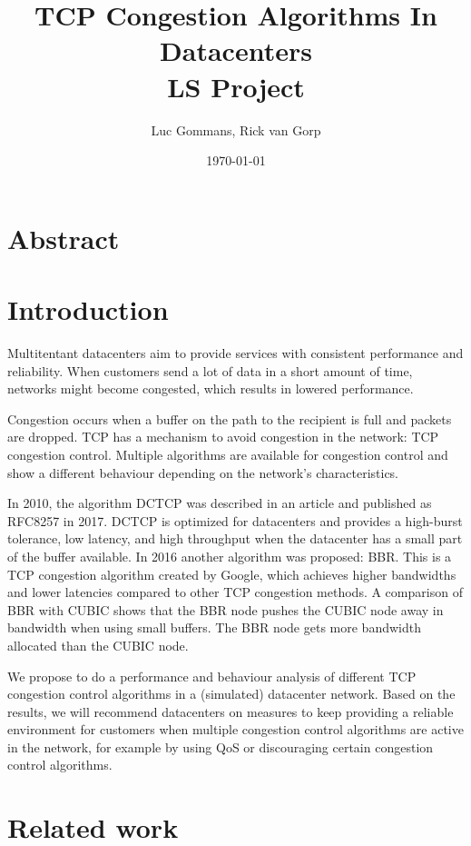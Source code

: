 \documentclass{article}
\title{TCP Congestion Algorithms In Datacenters \\
	\vspace{0.3cm}
	{\large LS Project}
}
\date{\today{}}
\author{Luc Gommans, Rick van Gorp}
\begin{document}
\maketitle

\section{Abstract}


\section{Introduction}


Multitentant datacenters aim to provide services with consistent performance
and reliability. When customers send a lot of data in a short amount of time,
networks might become congested, which results in lowered performance.

Congestion occurs when a buffer on the path to the recipient is full and
packets are dropped. TCP has a mechanism to avoid congestion in the network:
TCP congestion control. Multiple algorithms are available for congestion
control and show a different behaviour depending on the network's
characteristics.

In 2010, the algorithm DCTCP was described in an
article\cite{dctcp-congestion-original} and published as RFC8257 in
2017\cite{dctcp-congestion}. DCTCP is optimized for datacenters and provides a
high-burst tolerance, low latency, and high throughput when the datacenter has
a small part of the buffer available\cite{dctcp-congestion}. In 2016 another
algorithm was proposed: BBR. This is a TCP congestion algorithm created by
Google, which achieves higher bandwidths and lower latencies compared to other
TCP congestion methods\cite{bbr-congestion}. A comparison of BBR with
CUBIC\cite{bbr-congestion-comparison} shows that the BBR node pushes the CUBIC
node away in bandwidth when using small buffers. The BBR node gets more
bandwidth allocated than the CUBIC node.

We propose to do a performance and behaviour analysis of different TCP
congestion control algorithms in a (simulated) datacenter network. Based on the
results, we will recommend datacenters on measures to keep providing a reliable
environment for customers when multiple congestion control algorithms are
active in the network, for example by using QoS or discouraging certain
congestion control algorithms.


\section{Related work}
\end{document}
